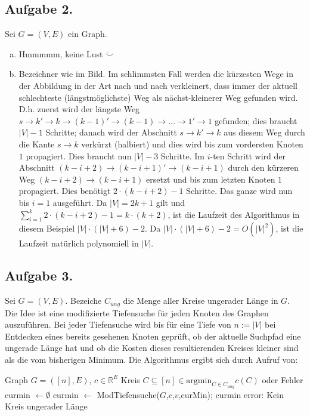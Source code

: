 \documentclass[11pt,a4paper,ngerman]{article}
\newcommand{\argmin}{\text{argmin}}
\begin{document}
\subsection*{Aufgabe 2.}
Sei $G = (V,E)$ ein Graph.
\begin{enumerate}[a)]
\item Hmmmmm, keine Lust $\ddot\smile$
\item Bezeichner wie im Bild. Im schlimmsten Fall werden die kürzesten Wege in der Abbildung in der Art nach und nach verkleinert, dass immer der aktuell schlechteste (längstmöglichste) Weg als nächst-kleinerer Weg gefunden wird. D.h. zuerst wird der längste Weg $s \to k' \to k \to (k-1)' \to (k-1) \to \ldots \to 1' \to 1$ gefunden; dies braucht $|V|-1$ Schritte; danach wird der Abschnitt $s \to k' \to k$ aus diesem Weg durch die Kante $s \to k$ verkürzt (halbiert) und dies wird bis zum vordersten Knoten $1$ propagiert. Dies braucht nun $|V|-3$ Schritte. Im $i$-ten Schritt wird der Abschnitt $(k-i+2) \to (k-i+1)' \to (k-i+1)$ durch den kürzeren Weg $(k-i+2) \to (k-i+1)$ ersetzt und bis zum letzten Knoten $1$ propagiert. Dies benötigt $2 \cdot (k-i+2) -1$ Schritte. Das ganze wird nun bis $i = 1$ ausgeführt. Da $|V| = 2k+1$ gilt und $\sum_{i=1}^k 2 \cdot (k-i+2) -1 = k \cdot (k+2)$, ist die Laufzeit des Algorithmus in diesem Beispiel $|V| \cdot (|V| + 6) - 2$. Da $|V| \cdot (|V| + 6) - 2 = O(|V|^2)$, ist die Laufzeit natürlich polynomiell in $|V|$.
\end{enumerate}

\subsection*{Aufgabe 3.}
Sei $G = (V,E)$. Bezeiche $C_{ung}$ die Menge aller Kreise ungerader Länge in $G$. \\

Die Idee ist eine modifizierte Tiefensuche für jeden Knoten des Graphen auszuführen.
Bei jeder Tiefensuche wird bis für eine Tiefe von $n := |V|$ bei Entdecken eines bereits gesehenen Knoten geprüft, ob der aktuelle Suchpfad eine ungerade Länge hat und ob die Kosten dieses resultierenden Kreises kleiner sind als die vom bisherigen Minimum.
Die Algorithmus ergibt sich durch Aufruf von: \\

\begin{algorithmic}[1]
\Require Graph $G = ([n],E)$, $c \in \mathbb{R}^E$
\Ensure Kreis $C \subseteq [n] \in \argmin_{C \in C_{ung}} c(C)$ oder Fehler
\State curmin $\gets \emptyset$
\State curmin $\gets$ ModTiefensuche($G$,$c$,$v$,curMin);
\EndFor
{}
  \State \Return curmin
\Else
  \State \Return error: Kein Kreis ungerader Länge
\EndIf
\end{algorithmic}
\end{document}
